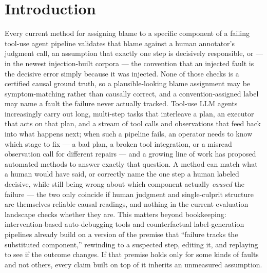 \documentclass[11pt]{article}
\begin{document}
\section{Introduction}

Every current method for assigning blame to a specific component of a failing tool-use agent pipeline validates that blame against a human annotator's judgment call, an assumption that exactly one step is decisively responsible, or --- in the newest injection-built corpora --- the convention that an injected fault is the decisive error simply because it was injected. None of those checks is a certified causal ground truth, so a plausible-looking blame assignment may be symptom-matching rather than causally correct, and a convention-assigned label may name a fault the failure never actually tracked. Tool-use LLM agents increasingly carry out long, multi-step tasks that interleave a plan, an executor that acts on that plan, and a stream of tool calls and observations that feed back into what happens next; when such a pipeline fails, an operator needs to know which stage to fix --- a bad plan, a broken tool integration, or a misread observation call for different repairs --- and a growing line of work has proposed automated methods to answer exactly that question. A method can match what a human would have said, or correctly name the one step a human labeled decisive, while still being wrong about which component actually \emph{caused} the failure --- the two only coincide if human judgment and single-culprit structure are themselves reliable causal readings, and nothing in the current evaluation landscape checks whether they are. This matters beyond bookkeeping: intervention-based auto-debugging tools and counterfactual label-generation pipelines already build on a version of the premise that ``failure tracks the substituted component,'' rewinding to a suspected step, editing it, and replaying to see if the outcome changes. If that premise holds only for some kinds of faults and not others, every claim built on top of it inherits an unmeasured assumption.
\end{document}
